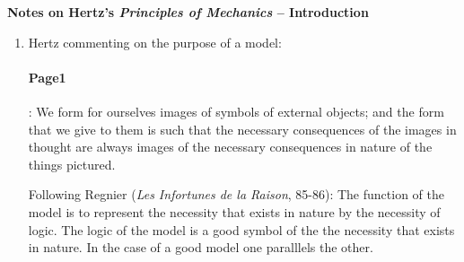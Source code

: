 \documentclass[11pt]{article}
\begin{document}
\begin{center}
{\bf\Large{Notes on Hertz's \emph{Principles of Mechanics} --
Introduction}}
\end{center}
\begin{enumerate}
\item Hertz commenting on the purpose of a model:
\paragraph{Page1}: We form for ourselves images of symbols of
external objects; and the form that we give to them is such that
the necessary consequences of the images in thought are always
images of the necessary consequences in nature of the things
pictured.

Following Regnier (\emph{Les Infortunes de la Raison}, 85-86):
The function of the model is to represent the necessity that exists in
nature by the necessity of logic.
The logic of the model is a good symbol of the the necessity that
exists in nature.
In the case of a good model one paralllels the other.
\end{enumerate}
\end{document}
